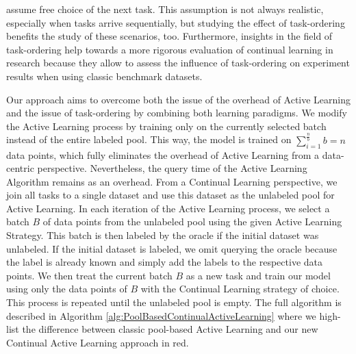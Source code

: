 assume free choice of the next task. This assumption is not always realistic, especially when tasks arrive sequentially, but studying the effect of task-ordering
benefits the study of these scenarios, too. Furthermore, insights in the field of task-ordering help towards a more rigorous evaluation of continual learning in 
research because they allow to assess the influence of task-ordering on experiment results when using classic benchmark datasets. \par
Our approach aims to overcome both the issue of the overhead of Active Learning and the issue of task-ordering by combining both learning paradigms. We modify the Active
Learning process by training only on the currently selected batch instead of the entire labeled pool. This way, the model is trained on $\sum_{i=1}^{\frac{n}{b}} b = n$ 
data points, which fully eliminates the overhead of Active Learning from a data-centric perspective. Nevertheless, the query time of the Active Learning Algorithm remains
as an overhead. From a Continual Learning perspective, we join all tasks to a single dataset and use this dataset as the unlabeled pool for Active Learning. In each iteration
of the Active Learning process, we select a batch $B$ of data points from the unlabeled pool using the given Active Learning Strategy. This batch is then labeled by the
oracle if the initial dataset was unlabeled. If the initial dataset is labeled, we omit querying the oracle because the label is already known and simply add the labels
to the respective data points. We then treat the current batch $B$ as a new task and train our model using only the data points of $B$ with the Continual Learning strategy of
choice. This process is repeated until the unlabeled pool is empty. The full algorithm is described in Algorithm \ref{alg:PoolBasedContinualActiveLearning} where we high-
list the difference between classic pool-based Active Learning and our new Continual Active Learning approach in red. \par

